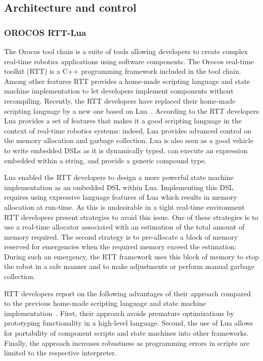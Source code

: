 \subsection{Architecture and control}

\newcommand{\ct}[1]{\texttt{#1}}

\subsubsection{OROCOS RTT-Lua}

The Orocos tool chain is a suite of tools allowing developers to
create complex real-time robotics applications using software
components. The Orocos real-time toolkit (RTT) is a C++ programming
framework included in the tool chain. Among other features RTT
provides a home-made scripting language and state machine
implementation to let developers implement components without
recompiling. Recently, the RTT developers have replaced their
home-made scripting language by a new one based on
Lua~\cite{Klotzbucher:2010fk}. According to the RTT developers Lua
provides a set of features that makes it a good scripting language in
the context of real-time robotics systems: indeed, Lua provides
advanced control on the memory allocation and garbage collection. Lua
is also seen as a good vehicle to write embedded DSLs as it is
dynamically typed, can execute an expression embedded within a string,
and provide a generic compound type.

Lua enabled the RTT developers to design a more powerful state machine
implementation as an embedded DSL within Lua. Implementing this DSL
requires using expressive language features of Lua which results in
memory allocation at run-time. As this is undesirable in a tight
real-time environment RTT developers present strategies to avoid this
issue. One of these strategies is to use a real-time allocator
associated with an estimation of the total amount of memory required.
The second strategy is to pre-allocate a block of memory reserved for
emergencies when the required memory exceed the estimation: During
such an emergency, the RTT framework uses this block of memory to stop
the robot in a safe manner and to make adjustments or perform manual
garbage collection.

RTT developers report on the following advantages of their approach
compared to the previous home-made scripting language and state
machine implementation~\cite{Klotzbucher:2010fk}. First, their
approach avoids premature optimizations by prototyping functionality
in a high-level language. Second, the use of Lua allows for
portability of component scripts and state machines into other
frameworks. Finally, the approach increases robustness as programming
errors in scripts are limited to the respective interpreter.

